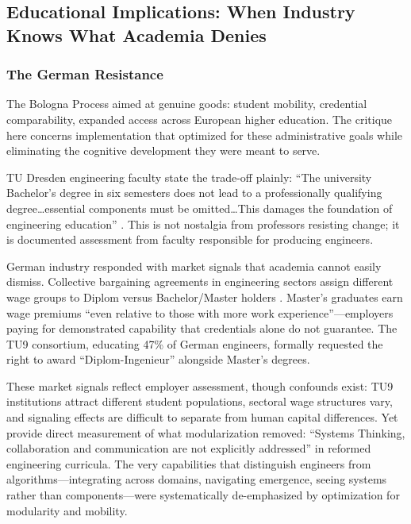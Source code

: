 \subsection{Educational Implications: When Industry Knows What Academia Denies}

\subsubsection{The German Resistance}

The Bologna Process aimed at genuine goods: student mobility, credential comparability, expanded access across European higher education. The critique here concerns implementation that optimized for these administrative goals while eliminating the cognitive development they were meant to serve.

TU Dresden engineering faculty state the trade-off plainly: ``The university Bachelor's degree in six semesters does not lead to a professionally qualifying degree\ldots essential components must be omitted\ldots This damages the foundation of engineering education'' \citep{odenbach2015}. This is not nostalgia from professors resisting change; it is documented assessment from faculty responsible for producing engineers.

German industry responded with market signals that academia cannot easily dismiss. Collective bargaining agreements in engineering sectors assign different wage groups to Diplom versus Bachelor/Master holders \citep{wieschke2020}. Master's graduates earn wage premiums ``even relative to those with more work experience''—employers paying for demonstrated capability that credentials alone do not guarantee. The TU9 consortium, educating 47\% of German engineers, formally requested the right to award ``Diplom-Ingenieur'' alongside Master's degrees.

These market signals reflect employer assessment, though confounds exist: TU9 institutions attract different student populations, sectoral wage structures vary, and signaling effects are difficult to separate from human capital differences. Yet \citet{kaiser2022} provide direct measurement of what modularization removed: ``Systems Thinking, collaboration and communication are not explicitly addressed'' in reformed engineering curricula. The very capabilities that distinguish engineers from algorithms—integrating across domains, navigating emergence, seeing systems rather than components—were systematically de-emphasized by optimization for modularity and mobility.

